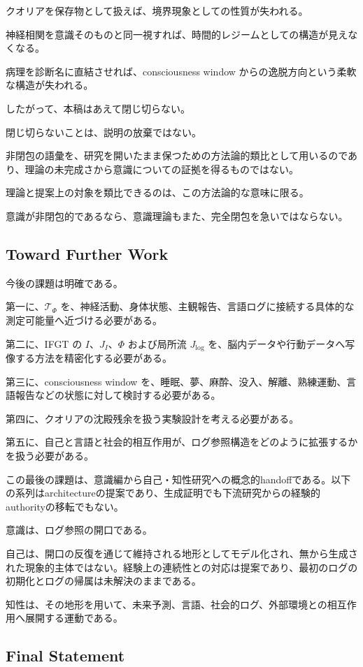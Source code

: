 クオリアを保存物として扱えば、境界現象としての性質が失われる。

神経相関を意識そのものと同一視すれば、時間的レジームとしての構造が見えなくなる。

病理を診断名に直結させれば、consciousness window からの逸脱方向という柔軟な構造が失われる。

したがって、本稿はあえて閉じ切らない。

閉じ切らないことは、説明の放棄ではない。

非閉包の語彙を、研究を開いたまま保つための方法論的類比として用いるのであり、理論の未完成さから意識についての証拠を得るものではない。

理論と提案上の対象を類比できるのは、この方法論的な意味に限る。

意識が非閉包的であるなら、意識理論もまた、完全閉包を急いではならない。

\subsection{Toward Further Work}

今後の課題は明確である。

第一に、$\mathcal{T}_{\Phi}$ を、神経活動、身体状態、主観報告、言語ログに接続する具体的な測定可能量へ近づける必要がある。

第二に、IFGT の $I$、$J_I$、$\Phi$ および局所流 $J_{\log}$ を、脳内データや行動データへ写像する方法を精密化する必要がある。

第三に、consciousness window を、睡眠、夢、麻酔、没入、解離、熟練運動、言語報告などの状態に対して検討する必要がある。

第四に、クオリアの沈殿残余を扱う実験設計を考える必要がある。

第五に、自己と言語と社会的相互作用が、ログ参照構造をどのように拡張するかを扱う必要がある。

この最後の課題は、意識編から自己・知性研究への概念的handoffである。以下の系列はarchitectureの提案であり、生成証明でも下流研究からの経験的authorityの移転でもない。

意識は、ログ参照の開口である。

自己は、開口の反復を通じて維持される地形としてモデル化され、無から生成された現象的主体ではない。経験上の連続性との対応は提案であり、最初のログの初期化とログの帰属は未解決のままである。

知性は、その地形を用いて、未来予測、言語、社会的ログ、外部環境との相互作用へ展開する運動である。

\subsection{Final Statement}

